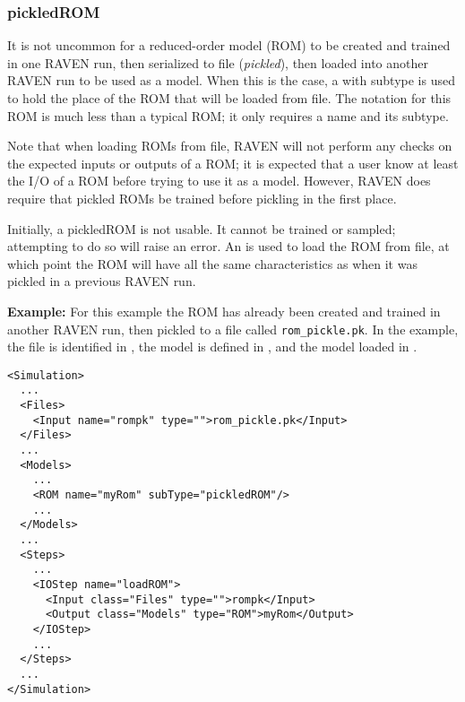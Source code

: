 \subsubsection{pickledROM}
\label{subsubsec:pickledROM}
It is not uncommon for a reduced-order model (ROM) to be created and trained in one RAVEN run, then
serialized to file (\emph{pickled}), then loaded into another RAVEN run to be used as a model.  When this is
the case, a  with subtype  is used to hold the place of the ROM that will
be loaded from file.  The notation for this ROM is much less than a typical ROM; it only requires a name and
its subtype.

Note that when loading ROMs from file, RAVEN will not perform any checks on the expected inputs or outputs of
a ROM; it is expected that a user know at least the I/O of a ROM before trying to use it as a model.
However, RAVEN does require that pickled ROMs be trained before pickling in the first place.

Initially, a pickledROM is not usable.  It cannot be trained or sampled; attempting to do so will raise an
error.  An  is used to load the ROM from file, at which point the ROM will have all the same
characteristics as when it was pickled in a previous RAVEN run.

\textbf{Example:}
For this example the ROM has already been created and trained in another RAVEN run, then pickled to a file
called \texttt{rom\_pickle.pk}.  In the example, the file is identified in , the model is
defined in , and the model loaded in .
{\footnotesize
\begin{lstlisting}[style=XML,morekeywords={name,subType}]
<Simulation>
  ...
  <Files>
    <Input name="rompk" type="">rom_pickle.pk</Input>
  </Files>
  ...
  <Models>
    ...
    <ROM name="myRom" subType="pickledROM"/>
    ...
  </Models>
  ...
  <Steps>
    ...
    <IOStep name="loadROM">
      <Input class="Files" type="">rompk</Input>
      <Output class="Models" type="ROM">myRom</Output>
    </IOStep>
    ...
  </Steps>
  ...
</Simulation>
\end{lstlisting}
}


